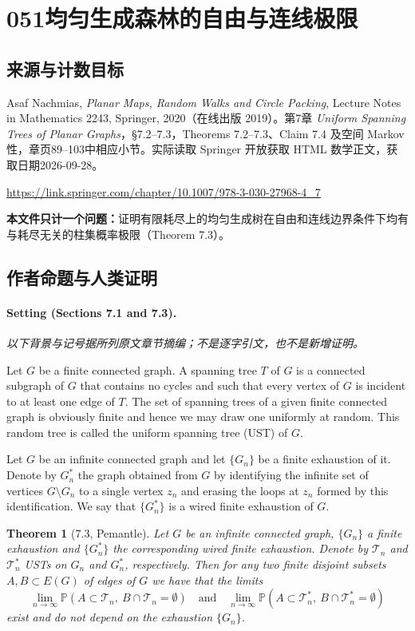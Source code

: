 \documentclass[UTF8,11pt]{ctexart}
\newtheorem*{theorem}{Theorem}
\theoremstyle{definition}
\newcommand{\Prob}{\mathbb P}
\begin{document}
\section*{051\quad 均匀生成森林的自由与连线极限}
\subsection*{来源与计数目标}
Asaf Nachmias, \emph{Planar Maps, Random Walks and Circle Packing}, Lecture Notes in Mathematics 2243, Springer, 2020（在线出版 2019）。第7章 \emph{Uniform Spanning Trees of Planar Graphs}，\S7.2--7.3，Theorems 7.2--7.3、Claim 7.4 及空间 Markov 性，章页89--103中相应小节。实际读取 Springer 开放获取 HTML 数学正文，获取日期2026-09-28。
\par\url{https://link.springer.com/chapter/10.1007/978-3-030-27968-4_7}
\par\textbf{本文件只计一个问题：}证明有限耗尽上的均匀生成树在自由和连线边界条件下均有与耗尽无关的柱集概率极限（Theorem 7.3）。
\subsection*{作者命题与人类证明}
\paragraph{Setting (Sections 7.1 and 7.3).}
\noindent\textit{以下背景与记号据所列原文章节摘编；不是逐字引文，也不是新增证明。}\par
Let $G$ be a finite connected graph. A spanning tree $T$ of $G$ is a connected subgraph of $G$ that contains no cycles and such that every vertex of $G$ is incident to at least one edge of $T$. The set of spanning trees of a given finite connected graph is obviously finite and hence we may draw one uniformly at random. This random tree is called the uniform spanning tree (UST) of $G$.

Let $G$ be an infinite connected graph and let $\{G_n\}$ be a finite exhaustion of it. Denote by $G_n^*$ the graph obtained from $G$ by identifying the infinite set of vertices $G\setminus G_n$ to a single vertex $z_n$ and erasing the loops at $z_n$ formed by this identification. We say that $\{G_n^*\}$ is a wired finite exhaustion of $G$.

\begin{theorem}[7.3, Pemantle]
Let $G$ be an infinite connected graph, $\{G_n\}$ a finite exhaustion and $\{G_n^*\}$ the corresponding wired finite exhaustion. Denote by $\mathcal T_n$ and $\mathcal T_n^*$ USTs on $G_n$ and $G_n^*$, respectively. Then for any two finite disjoint subsets $A,B\subset E(G)$ of edges of $G$ we have that the limits
\[
\lim_{n\to\infty}\Prob(A\subset\mathcal T_n,\ B\cap\mathcal T_n=\emptyset)
\quad\text{and}\quad
\lim_{n\to\infty}\Prob(A\subset\mathcal T_n^*,\ B\cap\mathcal T_n^*=\emptyset)
\]
exist and do not depend on the exhaustion $\{G_n\}$.
\end{theorem}
\end{document}
